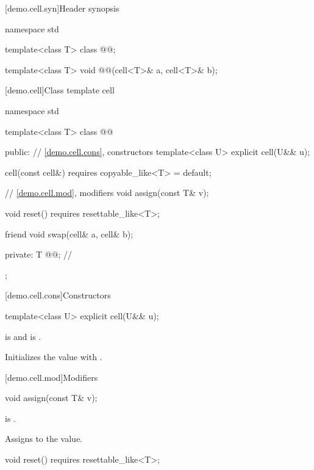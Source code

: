 [demo.cell.syn]{Header synopsis}

\begin{codeblock}
namespace std {
  template<class T> class @@;

  template<class T> void @@(cell<T>& a, cell<T>& b);
}
\end{codeblock}

[demo.cell]{Class template cell}

\begin{codeblock}
namespace std {
  template<class T>
  class @@ {
  public:
    // \ref{demo.cell.cons}, constructors
    template<class U> explicit cell(U&& u);

    cell(const cell&)
      requires copyable_like<T>
    = default;

    // \ref{demo.cell.mod}, modifiers
    void assign(const T& v);

    void reset()
      requires resettable_like<T>;

    friend void swap(cell& a, cell& b);

  private:
    T @@; // \expos
  };
}
\end{codeblock}

[demo.cell.cons]{Constructors}

%
\begin{itemdecl}
template<class U>
  explicit cell(U&& u);
\end{itemdecl}

\begin{itemdescr}
\pnum
\constraints
{} is  and  is .

\pnum
\effects
Initializes the value with .
\end{itemdescr}

[demo.cell.mod]{Modifiers}

%
\begin{itemdecl}
void assign(const T& v);
\end{itemdecl}

\begin{itemdescr}
\pnum
\constraints
{} is .

\pnum
\effects
Assigns  to the value.
\end{itemdescr}

%
\begin{itemdecl}
void reset()
  requires resettable_like<T>;
\end{itemdecl}

